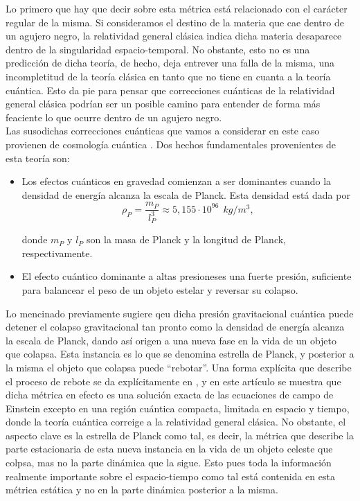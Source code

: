 \documentclass{article}
\numberwithin{equation}{section}
\theoremstyle{definition}
\begin{document}
Lo primero que hay que decir sobre esta métrica está relacionado con el carácter regular de la misma. Si consideramos el destino de la materia que cae dentro de un agujero negro, la relatividad general clásica indica dicha materia desaparece dentro de la singularidad espacio-temporal. No obstante, esto no es una predicción de dicha teoría, de hecho, deja entrever una falla de la misma, una incompletitud de la teoría clásica en tanto que no tiene en cuanta a la teoría cuántica. Esto da pie para pensar que correcciones cuánticas de la relatividad general clásica podrían ser un posible camino para entender de forma más feaciente lo que ocurre dentro de un agujero negro.\\

Las susodichas correcciones cuánticas que vamos a considerar en este caso provienen de cosmología cuántica \cite{rovelli}. Dos hechos fundamentales provenientes de esta teoría son:
\begin{itemize}
	\item Los efectos cuánticos en gravedad comienzan a ser dominantes cuando la densidad de energía alcanza la escala de Planck. Esta densidad está dada por 
	\begin{equation*}
	\rho_P = \frac{m_P}{l_P^3} \approx 5,155 \cdot 10^{96}\ \ kg/m^3,
	\end{equation*}
	
	donde $m_P$ y $l_P$ son la masa de Planck y la longitud de Planck, respectivamente.
	\item El efecto cuántico dominante a altas presioneses una fuerte presión, suficiente para balancear el peso de un objeto estelar y reversar su colapso.
\end{itemize}

Lo mencinado previamente sugiere qeu dicha presión gravitacional cuántica puede detener el colapso gravitacional tan pronto como la densidad de energía alcanza la escala de Planck, dando así origen a una nueva fase en la vida de un objeto que colapsa. Esta instancia es lo que se denomina estrella de Planck, y posterior a la misma el objeto que colapsa puede ``rebotar''. Una forma explícita que describe el proceso de rebote se da explícitamente en \cite{rovelliquantum}, y en este artículo se muestra que dicha métrica en efecto es una solución exacta de las ecuaciones de campo de Einstein excepto en una región cuántica compacta, limitada en espacio y tiempo, donde la teoría cuántica correige a la relatividad general clásica. No obstante, el aspecto clave es la estrella de Planck como tal, es decir, la métrica que describe la parte estacionaria de esta nueva instancia en la vida de un objeto celeste que colpsa, mas no la parte dinámica que la sigue. Esto pues toda la información realmente importante sobre el espacio-tiempo como tal está contenida en esta métrica estática y no en la parte dinámica posterior a la misma.\\
\end{document}
